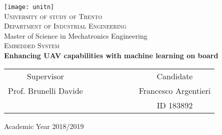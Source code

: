 \begin{titlepage}
 \begin{center}
 \texttt{[image: unitn]}\\
 \vspace{1.5em}
 {\Large \textsc{University of study of Trento}}\\
 \vspace{1.5em}
 {\Large \textsc{Department of Industrial Engineering}}\\
 \vspace{4em}
 {\normalsize Master of Science in Mechatronics Engineering}\\
 \vspace{1.5em}
 {\Large \textsc{Embedded System}}\\
 \vspace{4em}
 {\LARGE\textbf{
  Enhancing UAV capabilities with machine learning on board
 }}\\
 \end{center}

\vskip 2.0cm
\vskip 2.0cm
 \begin{center}
 \begin{tabular}{c c c c c c c c}
 Supervisor & & & & & & & Candidate \\[0.2cm]
 \large{Prof. Brunelli Davide} & & & & & & & \large{Francesco Argentieri}\\[0.4cm]
  & & & & & & & ID 183892\\[0.2cm]
 \end{tabular}
 \end{center}

\vskip 1.5cm
\begin{center}
{\normalsize Academic Year 2018/2019}
\end{center}
\end{titlepage}

\clearpage{\pagestyle{empty}\cleardoublepage}
